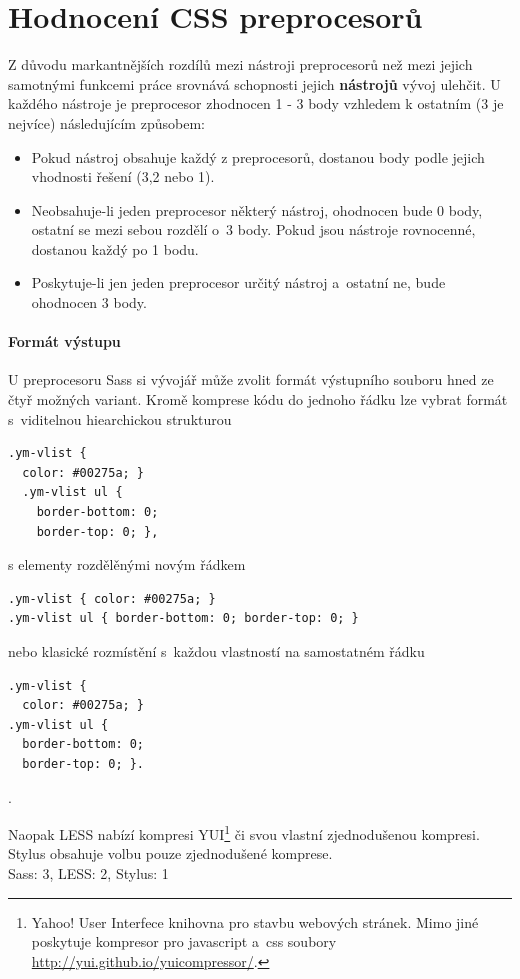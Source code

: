 \documentclass[thesis=B,czech]{FITthesis}[2012/06/26]
\begin{document}
\section{Hodnocení CSS preprocesorů}
Z důvodu markantnějších rozdílů mezi nástroji preprocesorů než mezi jejich samotnými funkcemi práce srovnává schopnosti jejich \textbf{nástrojů} vývoj ulehčit. U každého nástroje je preprocesor zhodnocen 1 - 3 body vzhledem k ostatním (3 je nejvíce) následujícím způsobem:

\begin{itemize}
 \item Pokud nástroj obsahuje každý z preprocesorů, dostanou body podle jejich vhodnosti řešení (3,2 nebo 1). 
 \item Neobsahuje-li jeden preprocesor některý nástroj, ohodnocen bude 0 body, ostatní se mezi sebou rozdělí o~3 body. Pokud jsou nástroje rovnocenné, dostanou každý po 1 bodu.
 \item Poskytuje-li jen jeden preprocesor určitý nástroj a~ostatní ne, bude ohodnocen 3 body. 
\end{itemize}

\paragraph{Formát výstupu}

 U preprocesoru \gls{Sass} si vývojář může zvolit formát výstupního souboru hned ze čtyř možných variant. Kromě komprese kódu do jednoho řádku lze vybrat formát s~viditelnou hiearchickou strukturou
\scriptsize
\begin{verbatim}
.ym-vlist {
  color: #00275a; }
  .ym-vlist ul {
    border-bottom: 0;
    border-top: 0; },
\end{verbatim}
\normalsize
s elementy rozdělěnými novým řádkem 
\scriptsize
\begin{verbatim}
.ym-vlist { color: #00275a; }
.ym-vlist ul { border-bottom: 0; border-top: 0; }
\end{verbatim}
\normalsize
nebo klasické rozmístění s~každou vlastností na samostatném řádku
\scriptsize
\begin{verbatim}
.ym-vlist {
  color: #00275a; }
.ym-vlist ul {
  border-bottom: 0;
  border-top: 0; }.
\end{verbatim}
\normalsize.

Naopak LESS nabízí kompresi YUI\footnote{Yahoo! User Interfece knihovna pro stavbu webových stránek. Mimo jiné poskytuje kompresor pro javascript a~css soubory \url{http://yui.github.io/yuicompressor/}.} či svou vlastní zjednodušenou kompresi. Stylus obsahuje volbu pouze zjednodušené komprese.\\
\gls{Sass}: 3, LESS: 2, Stylus: 1
\end{document}
